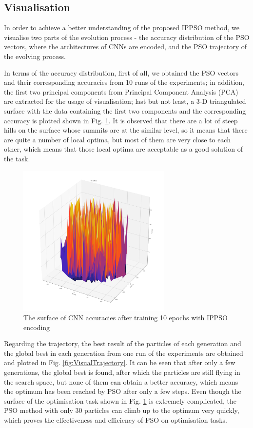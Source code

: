 \documentclass[conference]{IEEEtran}
\begin{document}
\subsection{Visualisation}\label{sec:Visulisation}

In order to achieve a better understanding of the proposed IPPSO method, we visualise two parts of the evolution process - the accuracy distribution of the PSO vectors, where the architectures of CNNs are encoded, and the PSO trajectory of the evolving process. 


In terms of the accuracy distribution, first of all, we obtained the PSO vectors and their corresponding accuracies from 10 runs of the experiments; in addition, the first two principal components from Principal Component Analysis (PCA) are extracted for the usage of visualisation; last but not least, a 3-D triangulated surface with the data containing the first two components and the corresponding accuracy is plotted shown in Fig. \ref{fig:Visual3DSurface}. It is observed that there are a lot of steep hills on the surface whose summits are at the similar level, so it means that there are quite a number of local optima, but most of them are very close to each other, which means that those local optima are acceptable as a good solution of the task. 

\begin{figure}[!t]
	\centering
	\includegraphics[width=3in]{ipec_pca_plot_2d_surface}
	\caption{The surface of CNN accuracies after training 10 epochs with IPPSO encoding}
	\label{fig:Visual3DSurface}
\end{figure}

Regarding the trajectory, the best result of the particles of each generation and the global best in each generation from one run of the experiments are obtained and plotted in Fig. \ref{fig:VisualTrajectory}. It can be seen that after only a few generations, the global best is found, after which the particles are still flying in the search space, but none of them can obtain a better accuracy, which means the optimum has been reached by PSO after only a few steps. Even though the surface of the optimisation task shown in Fig. \ref{fig:Visual3DSurface} is extremely complicated, the PSO method with only 30 particles can climb up to the optimum very quickly, which proves the effectiveness and efficiency of PSO on optimisation tasks. 
\end{document}
